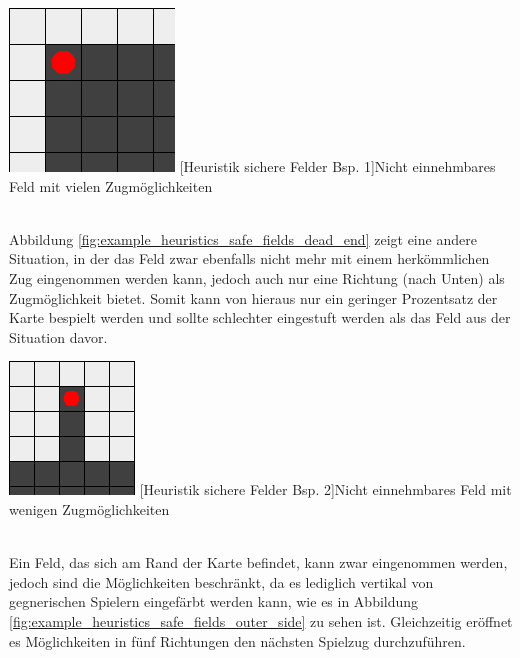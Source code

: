 \documentclass[12pt,a4paper,bibliography=totocnumbered,listof=totocnumbered]{article}
\begin{document}
\vspace{1em}
\begin{minipage}{\linewidth}
	\centering
	\includegraphics[width=0.3\linewidth]{pics/heuristics_safe_fields_corner.png}
	[Heuristik sichere Felder Bsp. 1]{Nicht einnehmbares Feld mit vielen 		Zugmöglichkeiten}
	\label{fig:example_heuristics_safe_fields_corner}
\end{minipage}
\\

Abbildung \ref{fig:example_heuristics_safe_fields_dead_end} zeigt eine andere Situation, in der das Feld zwar ebenfalls nicht mehr mit einem herkömmlichen Zug eingenommen werden kann, jedoch auch nur eine Richtung (nach Unten) als Zugmöglichkeit bietet. Somit kann von hieraus nur ein geringer Prozentsatz der Karte bespielt werden und sollte schlechter eingestuft werden als das Feld aus der Situation davor.

\vspace{1em}
\begin{minipage}{\linewidth}
	\centering
	\includegraphics[width=0.3\linewidth]{pics/heuristics_safe_fields_dead_end.png}
	[Heuristik sichere Felder Bsp. 2]{Nicht einnehmbares Feld mit wenigen Zugmöglichkeiten}
	\label{fig:example_heuristics_safe_fields_dead_end}
\end{minipage}
\\

Ein Feld, das sich am Rand der Karte befindet, kann zwar eingenommen werden, jedoch sind die Möglichkeiten beschränkt, da es lediglich vertikal von gegnerischen Spielern eingefärbt werden kann, wie es in Abbildung \ref{fig:example_heuristics_safe_fields_outer_side} zu sehen ist. Gleichzeitig eröffnet es Möglichkeiten in fünf Richtungen den nächsten Spielzug durchzuführen.
\end{document}
